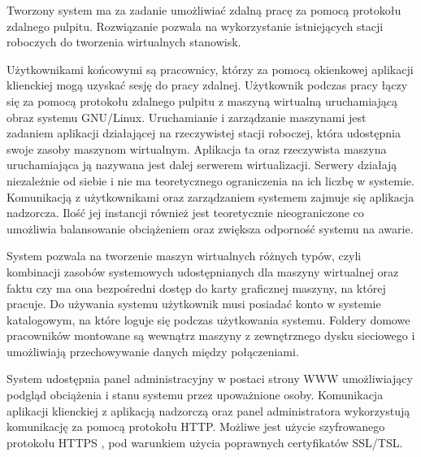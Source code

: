 \documentclass[../wstep.tex]{subfiles}
\begin{document}
Tworzony system ma za zadanie umożliwiać zdalną pracę za pomocą protokołu zdalnego pulpitu. Rozwiązanie pozwala na wykorzystanie istniejących stacji roboczych do tworzenia wirtualnych stanowisk.

Użytkownikami końcowymi są pracownicy, którzy za pomocą okienkowej aplikacji klienckiej mogą uzyskać sesję do pracy zdalnej. Użytkownik podczas pracy łączy się za pomocą protokołu zdalnego pulpitu z maszyną wirtualną uruchamiającą obraz systemu GNU/Linux. Uruchamianie i zarządzanie maszynami jest zadaniem aplikacji działającej na rzeczywistej stacji roboczej, która udostępnia swoje zasoby maszynom wirtualnym. Aplikacja ta oraz rzeczywista maszyna uruchamiająca ją nazywana jest dalej serwerem wirtualizacji. Serwery działają niezależnie od siebie i nie ma teoretycznego ograniczenia na ich liczbę w systemie. Komunikacją z użytkownikami oraz zarządzaniem systemem zajmuje się aplikacja nadzorcza. Ilość jej instancji również jest teoretycznie nieograniczone co umożliwia balansowanie obciążeniem oraz zwiększa odporność systemu na awarie.

System pozwala na tworzenie maszyn wirtualnych różnych typów, czyli kombinacji zasobów systemowych udostępnianych dla maszyny wirtualnej oraz faktu czy ma ona bezpośredni dostęp do karty graficznej maszyny, na której pracuje. Do używania systemu użytkownik musi posiadać konto w systemie katalogowym, na które loguje się podczas użytkowania systemu. Foldery domowe pracowników montowane są wewnątrz maszyny z zewnętrznego dysku sieciowego i umożliwiają przechowywanie danych między połączeniami.

System udostępnia panel administracyjny w postaci strony WWW umożliwiający podgląd obciążenia i stanu systemu przez upoważnione osoby. Komunikacja aplikacji klienckiej z aplikacją nadzorczą oraz panel administratora wykorzystują komunikację za pomocą protokołu HTTP. Możliwe jest użycie szyfrowanego protokołu HTTPS \parencite{rfc2818}, pod warunkiem użycia poprawnych certyfikatów SSL/TSL.
\end{document}

